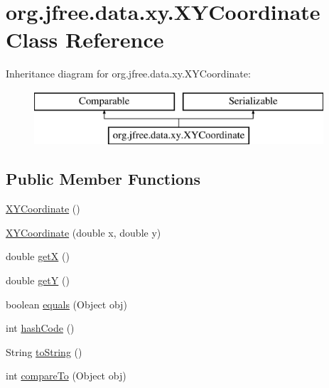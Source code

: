 \hypertarget{classorg_1_1jfree_1_1data_1_1xy_1_1_x_y_coordinate}{}\section{org.\+jfree.\+data.\+xy.\+X\+Y\+Coordinate Class Reference}
\label{classorg_1_1jfree_1_1data_1_1xy_1_1_x_y_coordinate}
Inheritance diagram for org.\+jfree.\+data.\+xy.\+X\+Y\+Coordinate\+:\begin{figure}[H]
\begin{center}
\leavevmode
\includegraphics[height=2.000000cm]{classorg_1_1jfree_1_1data_1_1xy_1_1_x_y_coordinate}
\end{center}
\end{figure}
\subsection*{Public Member Functions}
\begin{DoxyCompactItemize}
\item 
\mbox{\hyperlink{classorg_1_1jfree_1_1data_1_1xy_1_1_x_y_coordinate_aacd6ac1f9ff61fda63b9956ac06a9e79}{X\+Y\+Coordinate}} ()
\item 
\mbox{\hyperlink{classorg_1_1jfree_1_1data_1_1xy_1_1_x_y_coordinate_a2c617c73557ccc92b36cf878ec60f56d}{X\+Y\+Coordinate}} (double x, double y)
\item 
double \mbox{\hyperlink{classorg_1_1jfree_1_1data_1_1xy_1_1_x_y_coordinate_affb351e45d43d8ba5ee639f0ecd51484}{getX}} ()
\item 
double \mbox{\hyperlink{classorg_1_1jfree_1_1data_1_1xy_1_1_x_y_coordinate_aec1db6be9d6d9f9fa49c4ced9b8b4e36}{getY}} ()
\item 
boolean \mbox{\hyperlink{classorg_1_1jfree_1_1data_1_1xy_1_1_x_y_coordinate_aa9d11342c194c969e3f581efff41079f}{equals}} (Object obj)
\item 
int \mbox{\hyperlink{classorg_1_1jfree_1_1data_1_1xy_1_1_x_y_coordinate_af20e69e7a5ce6fae35ead510e334c058}{hash\+Code}} ()
\item 
String \mbox{\hyperlink{classorg_1_1jfree_1_1data_1_1xy_1_1_x_y_coordinate_a2f33a3dd4e8228019080f6f124162c88}{to\+String}} ()
\item 
int \mbox{\hyperlink{classorg_1_1jfree_1_1data_1_1xy_1_1_x_y_coordinate_a9335533eead72698a743996d29a03f02}{compare\+To}} (Object obj)
\end{DoxyCompactItemize}


